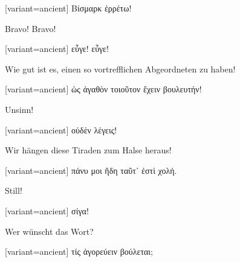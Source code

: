 \switchcolumn

\begin{greek}[variant=ancient]%
Βίσμαρκ ἐρρέτω!

\end{greek}%
\switchcolumn*

Bravo! Bravo!

\switchcolumn

\begin{greek}[variant=ancient]%
εὖγε! εὖγε!

\end{greek}%
\switchcolumn*

Wie gut ist es, einen so vortrefflichen Abgeordneten zu haben!

\switchcolumn

\begin{greek}[variant=ancient]%
ὡς ἀγαθὸν τοιοῦτον ἔχειν βουλευτήν!

\end{greek}%
\switchcolumn*

Unsinn!

\switchcolumn

\begin{greek}[variant=ancient]%
οὐδὲν λέγεις!

\end{greek}%
\switchcolumn*

Wir hängen diese Tiraden zum Halse heraus!

\switchcolumn

\begin{greek}[variant=ancient]%
πάνυ μοι ἤδη ταῦτ᾽ ἐστὶ χολή.

\end{greek}%
\switchcolumn*

Still!

\switchcolumn

\begin{greek}[variant=ancient]%
σίγα!

\end{greek}%
Wer wünscht das Wort?

\switchcolumn

\begin{greek}[variant=ancient]%
τίς ἀγορεύειν βούλεται;

\end{greek}%
\switchcolumn*

